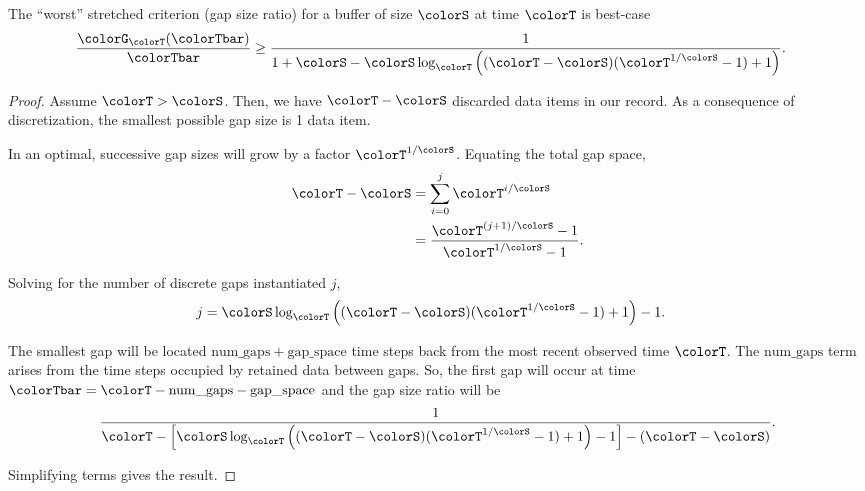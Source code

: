\begin{lemma}
\label{thm:stretched-ideal-strict}
The ``worst'' stretched criterion (gap size ratio) for a buffer of size $\colorS$ at time $\colorT$ is best-case
\begin{align*}
\frac{\colorG_{\colorT}(\colorTbar)}{\colorTbar}
&\geq
\frac{
  1
}{
  1 + \colorS
  - \colorS \log_{\colorT}\Big(
    (\colorT - \colorS)(\colorT^{1/\colorS} - 1) + 1
  \Big)
}.
  \end{align*}
\end{lemma}

\begin{proof}
Assume $\colorT > \colorS$.
Then, we have $\colorT - \colorS$ discarded data items in our record.
As a consequence of discretization, the smallest possible gap size is 1 data item.

In an optimal, successive gap sizes will grow by a factor $\colorT^{1/\colorS}$.
Equating the total gap space,
\begin{align*}
\colorT - \colorS
&=
\sum_{i = 0}^{j} \colorT^{i/\colorS} %
\\
&=
\frac{
  \colorT^{(j + 1)/\colorS} - 1
}{
  \colorT^{1/\colorS} - 1
}.
\end{align*}

Solving for the number of discrete gaps instantiated $j$,
\begin{align*}
j
&=
\colorS \log_{\colorT}\Big(
  (\colorT - \colorS)(\colorT^{1/\colorS} - 1) + 1
\Big) - 1.
\end{align*}

The smallest gap will be located $\mathrm{num\_gaps} + \mathrm{gap\_space}$ time steps back from the most recent observed time $\colorT$.
The $\mathrm{num\_gaps}$ term arises from the time steps occupied by retained data between gaps.
So, the first gap will occur at time $\colorTbar = \colorT - \mathrm{num\_gaps} - \mathrm{gap\_space}$ and the gap size ratio will be
\begin{align*}
\frac{1}{
\colorT
- \Big[
\colorS \log_{\colorT}\Big(
  (\colorT - \colorS)(\colorT^{1/\colorS} - 1) + 1
\Big) - 1
\Big] - (\colorT - \colorS)
}.
\end{align*}

Simplifying terms gives the result.
\end{proof}
